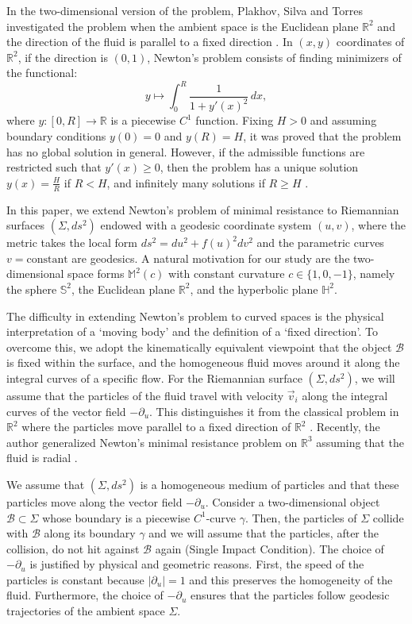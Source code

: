 \documentclass[a4paper,12pt]{amsart}
\theoremstyle{definition}
\def\r{\mathbb R}
\begin{document}
In the two-dimensional version of the problem,   Plakhov, Silva and Torres investigated the problem when the ambient space is the Euclidean plane $\r^2$ and the direction of the fluid is parallel to a fixed direction  \cite{pt1,pt2,st,tp}. In $(x,y)$ coordinates of $\r^2$, if the   direction is   $(0,1)$, Newton's problem consists of finding minimizers of the functional:
\begin{equation}\label{eq0}
y\mapsto \int_0^{R}\frac{1}{1+y'(x)^2}\, dx,
\end{equation}
where $y\colon [0,R]\to \r$ is a piecewise $C^1$ function. Fixing $H>0$ and assuming boundary conditions $y(0) = 0$ and $y(R) = H$, it was proved that the problem has no global solution in general. However, if the admissible functions are restricted such that $y'(x) \geq 0$, then the problem has a unique solution $y(x) =\frac{H}{R}$ if $R < H$, and infinitely many solutions if $R\geq H$ \cite{st}.  
 
In this paper, we extend Newton's problem of minimal resistance to Riemannian surfaces 
$(\Sigma, ds^2)$ endowed with a geodesic     coordinate system $(u,v)$, where the metric 
takes the local form $ds^2 = du^2 + f(u)^2 dv^2$ and the parametric curves $v=\text{constant}$ are geodesics. A natural motivation for our study 
are the two-dimensional space forms $\mathbb{M}^2(c)$ with constant curvature 
$c \in \{1, 0, -1\}$, namely the sphere $\mathbb{S}^2$, the Euclidean plane $\mathbb{R}^2$, and the hyperbolic plane $\mathbb{H}^2$.


 The  difficulty in extending Newton's problem to curved spaces is the physical interpretation of a `moving body' and the definition of a `fixed direction'. To overcome this, we adopt the kinematically equivalent viewpoint that the object $\mathcal{B}$ is fixed within the surface, and the homogeneous fluid moves around it along the integral curves of a specific   flow.  For the Riemannian surface $(\Sigma,ds^2)$, we will assume that the particles of the fluid travel with velocity $\vec{v}_i$ along the integral curves of the vector field $-\partial_u$.  This distinguishes it from the classical problem in $\r^2$ where the particles move parallel to  a fixed direction of $\r^2$  \cite{st}.   Recently, the author generalized Newton's minimal resistance problem on $\r^3$ assuming that the fluid is radial \cite{lo2}. 

We assume that    $(\Sigma,ds^2)$ is a homogeneous medium of particles and that these particles move along  the vector field $-\partial_u$. Consider a two-dimensional object $\mathcal{B}\subset\Sigma$ whose boundary is a piecewise $C^1$-curve $\gamma$. Then, the particles of $\Sigma$ collide with $\mathcal{B}$ along its boundary $\gamma$ and we will assume that the particles, after the collision, do not hit against $\mathcal{B}$ again  (Single Impact Condition). The choice of $-\partial_u$ is justified by physical and geometric reasons. First,   the speed of the particles is constant because $|\partial_u|=1$ and this preserves the homogeneity of the fluid. Furthermore, the choice of $-\partial_u$ ensures that the particles follow geodesic trajectories of the ambient space $\Sigma$.   
\end{document}
